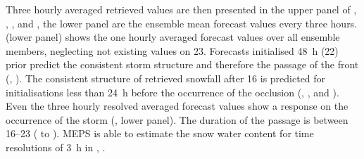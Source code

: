 Three hourly averaged retrieved values are then presented in the upper panel of , , , and , the lower panel are the ensemble mean forecast values every three hours.
\\
 (lower panel) shows the one hourly averaged forecast values over all ensemble members, neglecting not existing values on \SI{23}{\dec}. 
Forecasts initialised \SI{48}{\hour} (\SI{22}{\dec}) prior predict the consistent storm structure and therefore the passage of the front (, ). 
The consistent structure of retrieved snowfall after \SI{16}{\UTC} is predicted for initialisations less than \SI{24}{\hour} before the occurrence of the occlusion (, , and ).
Even the three hourly resolved averaged forecast values show a response on the occurrence of the storm (, lower panel). 
The duration of the passage is between \SIrange{16}{23}{\UTC} ( to ). MEPS is able to estimate the snow water content for time resolutions of \SI{3}{\hour} in , .
